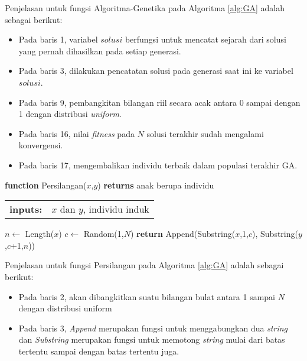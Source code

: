 Penjelasan untuk fungsi  Algoritma-Genetika pada Algoritma \ref{alg:GA} adalah sebagai berikut:
\begin{itemize}
	\item Pada baris 1, variabel $solusi$ berfungsi untuk mencatat sejarah dari solusi yang pernah dihasilkan pada setiap generasi.
	\item Pada baris 3, dilakukan pencatatan solusi pada generasi saat ini ke variabel $solusi$.
	\item Pada baris 9, pembangkitan bilangan riil secara acak antara 0 sampai dengan 1 dengan distribusi \textit{uniform}.
	\item Pada baris 16, nilai \textit{fitness} pada $N$ solusi terakhir sudah mengalami konvergensi.
	\item Pada baris 17, mengembalikan individu terbaik dalam populasi terakhir GA.
\end{itemize}

\begin{algorithm}[h]
	\begin{flushleft}
		\textbf{function} Persilangan($x$,$y$) \textbf{returns} anak berupa individu
		\begin{flushleft}
			\begin{tabular}{ l l }
				\textbf{inputs:}& $x$ dan $y$, individu induk
				\hspace{5pt} 
			\end{tabular} 
		\end{flushleft}
	\end{flushleft}

	\begin{algorithmic}[1]
		\STATE $n \leftarrow$ Length($x$)
		\STATE $c \leftarrow$ Random(1,$N$)
		\STATE \textbf{return} Append(Substring($x$,1,$c$), Substring($y$,$c$+1,$n$))
	\end{algorithmic}
\end{algorithm}

Penjelasan untuk fungsi Persilangan pada Algoritma \ref{alg:GA} adalah sebagai berikut:
\begin{itemize}
	\item Pada baris 2, akan dibangkitkan suatu bilangan bulat antara 1 sampai $N$ dengan distribusi uniform
	\item Pada baris 3, \textit{Append} merupakan fungsi untuk menggabungkan dua \textit{string} dan \textit{Substring} merupakan fungsi untuk memotong \textit{string} mulai dari batas tertentu sampai dengan batas tertentu juga.
\end{itemize}


